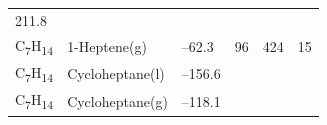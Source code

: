 \documentclass[
]{book}
\theoremstyle{definition}
\theoremstyle{definition}
\theoremstyle{definition}
\theoremstyle{remark}
\begin{document}
\begin{longtable}[]{@{}llllll@{}}
\begin{minipage}[t]{0.14\columnwidth}
211.8\strut
\end{minipage}\tabularnewline
\begin{minipage}[t]{0.07\columnwidth}\raggedright
C\textsubscript{7}H\textsubscript{14}\strut
\end{minipage} & \begin{minipage}[t]{0.17\columnwidth}\raggedright
1-Heptene(g)\strut
\end{minipage} & \begin{minipage}[t]{0.15\columnwidth}\raggedright
--62.3\strut
\end{minipage} & \begin{minipage}[t]{0.15\columnwidth}\raggedright
96\strut
\end{minipage} & \begin{minipage}[t]{0.14\columnwidth}\raggedright
424\strut
\end{minipage} & \begin{minipage}[t]{0.14\columnwidth}\raggedright
15\strut
\end{minipage}\tabularnewline
\begin{minipage}[t]{0.07\columnwidth}\raggedright
C\textsubscript{7}H\textsubscript{14}\strut
\end{minipage} & \begin{minipage}[t]{0.17\columnwidth}\raggedright
Cycloheptane(l)\strut
\end{minipage} & \begin{minipage}[t]{0.15\columnwidth}\raggedright
--156.6\strut
\end{minipage} & \begin{minipage}[t]{0.15\columnwidth}\raggedright
\strut
\end{minipage} & \begin{minipage}[t]{0.14\columnwidth}\raggedright
\strut
\end{minipage} & \begin{minipage}[t]{0.14\columnwidth}\raggedright
\strut
\end{minipage}\tabularnewline
\begin{minipage}[t]{0.07\columnwidth}\raggedright
C\textsubscript{7}H\textsubscript{14}\strut
\end{minipage} & \begin{minipage}[t]{0.17\columnwidth}\raggedright
Cycloheptane(g)\strut
\end{minipage} & \begin{minipage}[t]{0.15\columnwidth}\raggedright
--118.1\strut
\end{minipage} & \begin{minipage}[t]{0.15\columnwidth}\raggedright

\end{minipage}
\end{longtable}
\end{document}
